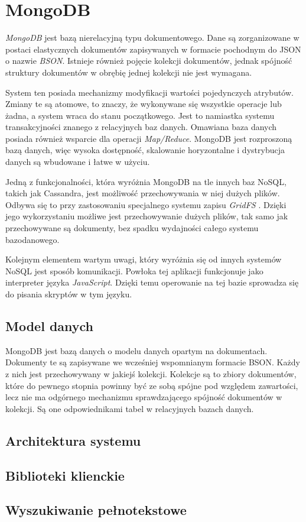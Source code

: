\section{MongoDB}

\textit{MongoDB} jest bazą nierelacyjną typu dokumentowego.
Dane są zorganizowane w postaci elastycznych dokumentów zapisywanych w formacie pochodnym do JSON o nazwie \textit{BSON}.
Istnieje również pojęcie kolekcji dokumentów, jednak spójność struktury dokumentów w obrębię jednej kolekcji nie jest wymagana.

System ten posiada mechanizmy modyfikacji wartości pojedynczych atrybutów.
Zmiany te są atomowe, to znaczy, że wykonywane się wszystkie operacje lub żadna, a system wraca do stanu początkowego.
Jest to namiastka systemu transakcyjności znanego z relacyjnych baz danych.
Omawiana baza danych posiada również wsparcie dla operacji \textit{Map/Reduce}. 
MongoDB jest rozproszoną bazą danych, więc wysoka dostępność, skalowanie horyzontalne i dystrybucja danych są wbudowane i łatwe w użyciu.

Jedną z funkcjonalności, która wyróżnia MongoDB na tle innych baz NoSQL, takich jak Cassandra, jest możliwość przechowywania w niej dużych plików.
Odbywa się to przy zastosowaniu specjalnego systemu zapisu \textit{GridFS} \cite{GridFSManual}.
Dzięki jego wykorzystaniu możliwe jest przechowywanie dużych plików, tak samo jak przechowywane są dokumenty, bez spadku wydajności całego systemu bazodanowego.

Kolejnym elementem wartym uwagi, który wyróżnia się od innych systemów NoSQL jest sposób komunikacji.
Powłoka tej aplikacji funkcjonuje jako interpreter języka \textit{JavaScript}.
Dzięki temu operowanie na tej bazie sprowadza się do pisania skryptów w tym języku.

\subsection{Model danych}

MongoDB jest bazą danych o modelu danych opartym na dokumentach.
Dokumenty te są zapisywane we wcześniej wspomnianym formacie BSON.
Każdy z nich jest przechowywany w jakiejś kolekcji.
Kolekcje są to zbiory dokumentów, które do pewnego stopnia powinny być ze sobą spójne pod względem zawartości, lecz nie ma odgórnego mechanizmu sprawdzającego spójność dokumentów w kolekcji.
Są one odpowiednikami tabel w relacyjnych bazach danych.



\subsection{Architektura systemu}

\subsection{Biblioteki klienckie}

\subsection{Wyszukiwanie pełnotekstowe}
